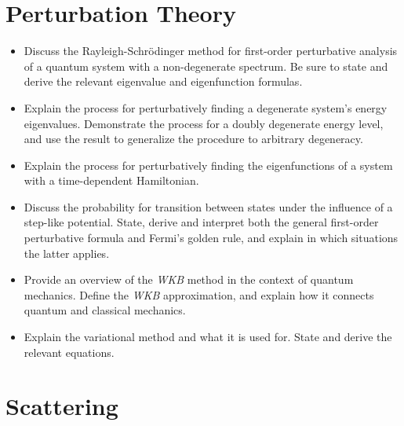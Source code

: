 \section{Perturbation Theory}

\begin{itemize}

    \item Discuss the Rayleigh-Schrödinger method for first-order perturbative analysis of a quantum system with a non-degenerate spectrum. Be sure to state and derive the relevant eigenvalue and eigenfunction formulas.

    \item Explain the process for perturbatively finding a degenerate system's energy eigenvalues. Demonstrate the process for a doubly degenerate energy level, and use the result to generalize the procedure to arbitrary degeneracy.

    \item Explain the process for perturbatively finding the eigenfunctions of a system with a time-dependent Hamiltonian.

    \item Discuss the probability for transition between states under the influence of a step-like potential. State, derive and interpret both the general first-order perturbative formula and Fermi's golden rule, and explain in which situations the latter applies.

    \item Provide an overview of the \emph{WKB} method in the context of quantum mechanics. Define the \emph{WKB} approximation, and explain how it connects quantum and classical mechanics.

    \item Explain the variational method and what it is used for. State and derive the relevant equations.

\end{itemize}

\section{Scattering}

